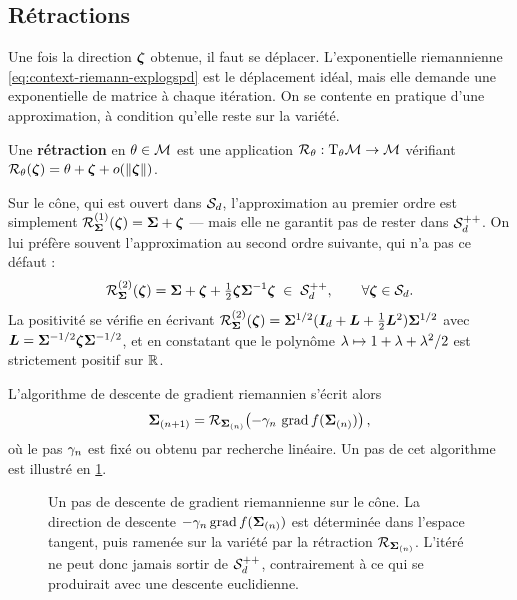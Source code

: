 \subsection{Rétractions}

Une fois la direction $\boldsymbol{\zeta}$ obtenue, il faut se déplacer. L'exponentielle riemannienne \cref{eq:context-riemann-explogspd} est le déplacement idéal, mais elle demande une exponentielle de matrice à chaque itération. On se contente en pratique d'une approximation, à condition qu'elle reste sur la variété.

\begin{definition}[{Rétraction}]
\label{def:context-riemann-retraction}
  Une \textbf{rétraction} en $\theta\in\mathcal{M}$ est une application $\mathcal{R}_\theta:\mathrm{T}_{\theta}\mathcal{M}\to\mathcal{M}$ vérifiant $\mathcal{R}_\theta(\boldsymbol{\zeta})=\theta+\boldsymbol{\zeta}+o(\left\lVert\boldsymbol{\zeta}\right\rVert)$.
\end{definition}

Sur le cône, qui est ouvert dans $\mathcal{S}_{d}$, l'approximation au premier ordre est simplement $\mathcal{R}^{(1)}_{\boldsymbol{\Sigma}}(\boldsymbol{\zeta})=\boldsymbol{\Sigma}+\boldsymbol{\zeta}$ --- mais elle ne garantit pas de rester dans $\mathcal{S}_{d}^{++}$. On lui préfère souvent l'approximation au second ordre suivante, qui n'a pas ce défaut :
\begin{equation}
  \mathcal{R}^{(2)}_{\boldsymbol{\Sigma}}(\boldsymbol{\zeta})
  =
  \boldsymbol{\Sigma} + \boldsymbol{\zeta} + \tfrac{1}{2}\boldsymbol{\zeta}{\boldsymbol{\Sigma}}^{-1}\boldsymbol{\zeta}
  \;\in\;\mathcal{S}_{d}^{++},
  \qquad \forall\boldsymbol{\zeta}\in\mathcal{S}_{d}.
  \label{eq:context-riemann-retraction2}
\end{equation}
La positivité se vérifie en écrivant $\mathcal{R}^{(2)}_{\boldsymbol{\Sigma}}(\boldsymbol{\zeta})=\boldsymbol{\Sigma}^{1/2}(\boldsymbol{I}_{d}+\boldsymbol{L}+\tfrac{1}{2}\boldsymbol{L}^2)\boldsymbol{\Sigma}^{1/2}$ avec $\boldsymbol{L}=\boldsymbol{\Sigma}^{-1/2}\boldsymbol{\zeta}\boldsymbol{\Sigma}^{-1/2}$, et en constatant que le polynôme $\lambda\mapsto 1+\lambda+\lambda^2/2$ est strictement positif sur $\mathbb{R}$.

L'algorithme de descente de gradient riemannien s'écrit alors
\begin{equation}
  \boldsymbol{\Sigma}_{(n+1)}
  =
  \mathcal{R}_{\boldsymbol{\Sigma}_{(n)}}\!\left(-\gamma_n\,\operatorname{\operatorname{grad}} f(\boldsymbol{\Sigma}_{(n)})\right),
  \label{eq:context-riemann-descente}
\end{equation}
où le pas $\gamma_n$ est fixé ou obtenu par recherche linéaire. Un pas de cet algorithme est illustré en \cref{fig:context-riemann-descente}.

\begin{figure}
  \centering
  
  \caption{Un pas de descente de gradient riemannienne sur le cône. La direction
    de descente $-\gamma_n\operatorname{\operatorname{grad}} f(\boldsymbol{\Sigma}_{(n)})$ est déterminée dans
    l'espace tangent, puis ramenée sur la variété par la rétraction
    $\mathcal{R}_{\boldsymbol{\Sigma}_{(n)}}$. L'itéré ne peut donc jamais sortir de
    $\mathcal{S}_{d}^{++}$, contrairement à ce qui se produirait avec une descente
    euclidienne.}
  \label{fig:context-riemann-descente}
\end{figure}

